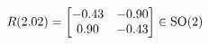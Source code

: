 \documentclass[preview]{standalone}
\begin{document}
\begin{align*}
\special{dvisvgm:raw <g id='unique000'>}R(2.02) = \begin{bmatrix} -0.43 & -0.90 \\ 0.90 & -0.43 \end{bmatrix} \in \text{SO}(2)\special{dvisvgm:raw </g>}
\end{align*}
\end{document}
